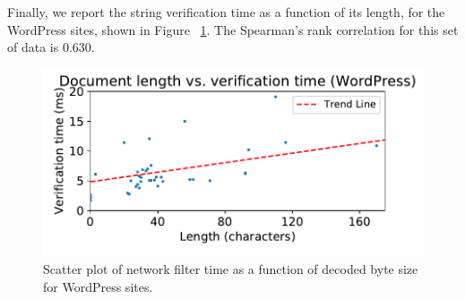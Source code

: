 Finally, we report the string verification time as a function of its length, for the WordPress sites, shown in Figure ~\ref{fig:verification_time_string_length_wordpress}. The Spearman's rank correlation for this set of data is 0.630. 

\begin{figure}[h]
	\includegraphics[scale=0.55]{results/string_length_vs_verification_time_wordpress_small.pdf}
	\caption{Scatter plot of network filter time as a function of decoded byte size for WordPress sites.}
	\label{fig:verification_time_string_length_wordpress}
\end{figure}
